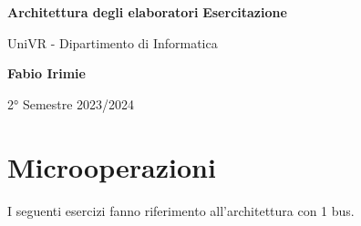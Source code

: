 \documentclass[a4paper]{article}
\theoremstyle{break}
\theoremstyle{break}
\theoremstyle{break}
\theoremstyle{break}
\begin{document}
\begin{center}
  \vspace*{1cm}

  \Huge
  \textbf{Architettura degli elaboratori}
  \LARGE
  \textbf{Esercitazione}

  \vspace{0.5cm}
  \LARGE
  UniVR - Dipartimento di Informatica

  \vspace{1.5cm}

  \textbf{Fabio Irimie}

  \vfill


  \vspace{0.8cm}


  2° Semestre 2023/2024

\end{center}

\pagebreak
\tableofcontents
\pagebreak

\section{Microoperazioni}
I seguenti esercizi fanno riferimento all'architettura con 1 bus.
\end{document}
